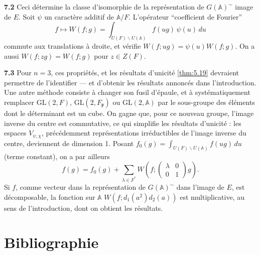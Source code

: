 \documentclass[12pt,a4paper]{article}
\theoremstyle{plain}
\theoremstyle{definition}
\theoremstyle{remark}
\newcommand{\Af}{\mathbb{A}}
\newcommand{\frakp}{\mathfrak{p}}
\providecommand{\frakp}{\mathfrak{p}}
\begin{document}
\textbf{7.2} Ceci détermine la classe d'isomorphie de la représentation de $G(\Af)^\sim$ image de $E$. Soit $\psi$ un caractère additif de $\Af/F$. L'opérateur ``coefficient de Fourier''
\[
f \longmapsto W(f; g) = \int_{U(F) \backslash U(\Af)} f(ug) \, \psi(u) \, du
\]
commute aux translations à droite, et vérifie $W(f; ug) = \psi(u) W(f; g)$. On a aussi $W(f; zg) = W(f; g)$ pour $z \in Z(F)$.

\textbf{7.3} Pour $n = 3$, ces propriétés, et les résultats d'unicité \ref{thm:5.19} devraient permettre de l'identifier --- et d'obtenir les résultats annoncés dans l'introduction. Une autre méthode consiste à changer son fusil d'épaule, et à systématiquement remplacer $\mathrm{GL}(2, F)$, $\mathrm{GL}(2, F_\frakp)$ ou $\mathrm{GL}(2, \Af)$ par le sous-groupe des éléments dont le déterminant est un cube. On gagne que, pour ce nouveau groupe, l'image inverse du centre est commutative, ce qui simplifie les résultats d'unicité : les espaces $V_{\psi, \chi}$, précédemment représentations irréductibles de l'image inverse du centre, deviennent de dimension 1. Posant $f_0(g) = \int_{U(F) \backslash U(\Af)} f(ug) \, du$ (terme constant), on a par ailleurs
\[
f(g) = f_0(g) + \sum_{\lambda \in F^*} W(f; \begin{pmatrix} \lambda & 0 \\ 0 & 1 \end{pmatrix} g).
\]
Si $f$, comme vecteur dans la représentation de $G(\Af)^\sim$ dans l'image de $E$, est décomposable, la fonction sur $\Af$ $W(f; d_1(a^2) d_2(a))$ est multiplicative, au sens de l'introduction, dont on obtient les résultats.

\section*{Bibliographie}
\end{document}
